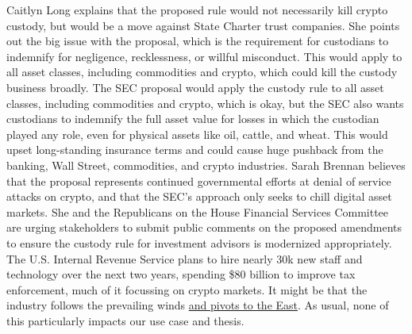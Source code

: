 Caitlyn Long explains that the proposed rule would not necessarily kill crypto custody, but would be a move against State Charter trust companies. She points out the big issue with the proposal, which is the requirement for custodians to indemnify for negligence, recklessness, or willful misconduct. This would apply to all asset classes, including commodities and crypto, which could kill the custody business broadly. The SEC proposal would apply the custody rule to all asset classes, including commodities and crypto, which is okay, but the SEC also wants custodians to indemnify the full asset value for losses in which the custodian played any role, even for physical assets like oil, cattle, and wheat. This would upset long-standing insurance terms and could cause huge pushback from the banking, Wall Street, commodities, and crypto industries. Sarah Brennan believes that the proposal represents continued governmental efforts at denial of service attacks on crypto, and that the SEC's approach only seeks to chill digital asset markets. She and the Republicans on the House Financial Services Committee are urging stakeholders to submit public comments on the proposed amendments to ensure the custody rule for investment advisors is modernized appropriately. The U.S. Internal Revenue Service plans to hire nearly 30k new staff and technology over the next two years, spending \$80 billion to improve tax enforcement, much of it focussing on crypto markets. It might be that the industry follows the prevailing winds \href{https://noelleacheson.substack.com/p/weekly-feb-25-2023}{and pivots to the East}. As usual, none of this particularly impacts our use case and thesis.
